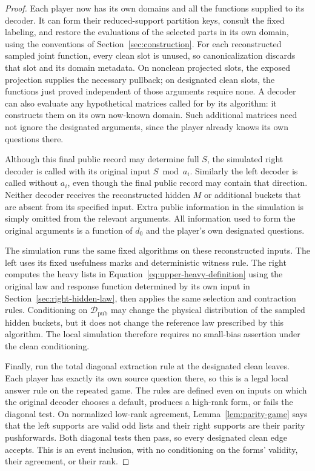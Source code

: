 \begin{proof}
Each player now has its own domains and all the functions supplied
to its decoder.  It can form their reduced-support partition keys,
consult the fixed labeling, and restore the evaluations of the
selected parts in its own domain, using the conventions of
Section~\ref{sec:construction}.  For each reconstructed sampled joint function, every clean slot is
unused, so canonicalization discards that slot and its domain metadata.  On nonclean projected
slots, the exposed projection supplies the necessary pullback; on
designated clean slots, the functions just proved independent of
those arguments require none.  A decoder can also evaluate any
hypothetical matrices called for by its algorithm: it constructs
them on its own now-known domain.  Such additional matrices need
not ignore the designated arguments, since the player already knows
its own questions there.

Although this final public record may determine full $S$, the
simulated right decoder is called with its original input
$S\bmod a_i$.  Similarly the left decoder is called without $a_i$,
even though the final public record may contain that direction.
Neither decoder receives the reconstructed hidden $M$ or additional
buckets that are absent from its specified input.  Extra public
information in the simulation is simply omitted from the relevant
arguments.  All information used to form the original arguments is
a function of $d_0$ and the player's own designated questions.

The simulation runs the same fixed algorithms on these reconstructed
inputs.  The left uses its fixed usefulness marks and deterministic witness
rule.  The right computes the heavy lists in
Equation~\eqref{eq:upper-heavy-definition} using the original law and response
function determined by its own input in Section~\ref{sec:right-hidden-law},
then applies the same selection and contraction rules.
Conditioning on $\mathcal D_{\mathrm{pub}}$ may change the physical distribution of the
sampled hidden buckets, but it does not change the reference law prescribed
by this algorithm.  The local simulation therefore requires no small-bias
assertion under the clean conditioning.

Finally, run the total diagonal extraction rule at the designated
clean leaves.  Each player has exactly its own source question there,
so this is a legal local answer rule on the repeated game.  The rules
are defined even on inputs on which the original decoder chooses a
default, produces a high-rank form, or fails the diagonal test.  On
normalized low-rank agreement, Lemma~\ref{lem:parity-game} says that
the left supports are valid odd lists and their right supports are
their parity pushforwards.  Both diagonal tests then pass, so every
designated clean edge accepts.  This is an event inclusion, with no
conditioning on the forms' validity, their agreement, or their rank.
\end{proof}


